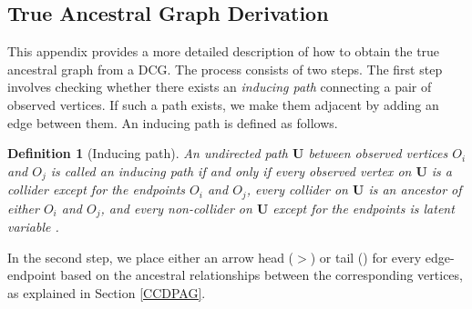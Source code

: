 \documentclass[twoside, 11pt]{article}
\newtheorem{definition}{Definition}
\begin{document}
\begin{appendices}


\section{True Ancestral Graph Derivation}\label{trueancestral}
This appendix provides a more detailed description of how to obtain the true ancestral graph from a DCG. The process consists of two steps. The first step involves checking whether there exists an \textit{inducing path} connecting a pair of observed vertices. If such a path exists,  we make them adjacent by adding an edge between them. An inducing path is defined as follows.

\begin{definition} [Inducing path] \label{def: def1}
An undirected path $\mathbf{U}$ between observed vertices $O_i$ and $O_j$ is called an inducing path if and only if every observed vertex on $\mathbf{U}$ is a collider except for the endpoints $O_i$ and $O_j$, every collider on $\mathbf{U}$ is an ancestor of either $O_i$ and $O_j$, and every non-collider on $\mathbf{U}$ except for the endpoints is latent variable .
\end{definition}

\noindent In the second step, we place either an arrow head ($>$) or tail (\textendash) for every edge-endpoint based on the ancestral relationships between the corresponding vertices, as explained in Section \ref{CCDPAG}.


\end{appendices}
\end{document}
